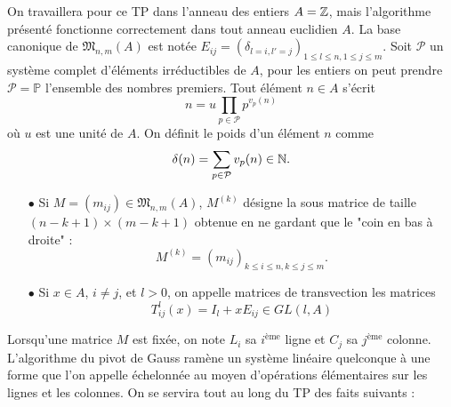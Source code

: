 On travaillera pour ce TP dans l'anneau des entiers $A=\mathbb Z$, mais l'algorithme présenté fonctionne correctement dans tout anneau euclidien $A$. La base canonique de $\mathfrak M_{n,m}(A)$ est notée $E_{ij}=(\delta_{l=i,l'=j})_{1\leq l\leq n,1\leq j\leq m}$. Soit $\mathcal P$ un système complet d'éléments irréductibles de $A$, pour les entiers on peut prendre $\mathcal P=\mathbb P$ l'ensemble des nombres premiers. Tout élément $n\in A$ s'écrit 
\[n=u\prod_{p\in\mathcal P} p^{v_p(n)}\]
où $u$ est une unité de $A$. On définit le poids d'un élément $n$ comme
\[\delta(n)=\sum_{p\in\mathcal P} v_p(n) \in \mathbb N.\]

\begin{itemize}
\item[$\bullet$] Si $M=(m_{ij})\in \mathfrak M_{n,m}(A)$, $M^{(k)}$ désigne la sous matrice de taille $(n-k+1)\times (m-k+1) $ obtenue en ne gardant que le "coin en bas à droite" :
\[M^{(k)}=(m_{ij})_{k\leq i\leq n,k\leq j\leq m}.\]
\item[$\bullet$] Si $x\in A$, $i\neq j$, et $l>0$, on appelle matrices de transvection les matrices 
\[T_{ij}^l(x)=I_l + xE_{ij}\in GL(l,A)\]
\end{itemize}

Lorsqu'une matrice $M$ est fixée, on note $L_i$ sa $i^{\text{ème}}$ ligne et $C_j$ sa $j^{\text{ème}}$ colonne. L'algorithme du pivot de Gauss ramène un système linéaire quelconque à une forme que l'on appelle échelonnée au moyen d'opérations élémentaires sur les lignes et les colonnes. On se servira tout au long du TP des faits suivants : \\

